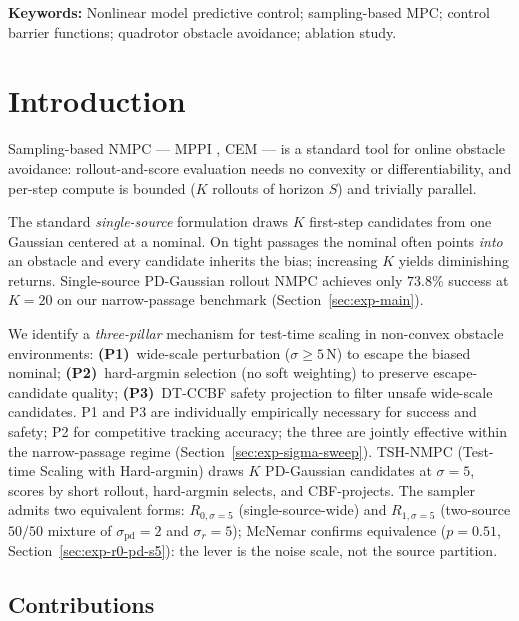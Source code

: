 \documentclass[11pt,onecolumn,a4paper]{article}
\newcommand{\pd}{\mathrm{pd}}
\begin{document}
\medskip
\noindent\textbf{Keywords:} Nonlinear model predictive control; sampling-based MPC; control barrier functions; quadrotor obstacle avoidance; ablation study.
\medskip

\section{Introduction}

Sampling-based NMPC --- MPPI \cite{WIL17}, CEM \cite{BOT13} --- is a
standard tool for online obstacle avoidance: rollout-and-score
evaluation needs no convexity or differentiability, and per-step
compute is bounded ($K$ rollouts of horizon $S$) and trivially parallel.

The standard \emph{single-source} formulation draws $K$ first-step
candidates from one Gaussian centered at a nominal. On tight passages
the nominal often points \emph{into} an obstacle and every candidate
inherits the bias; increasing $K$ yields diminishing returns.
Single-source PD-Gaussian rollout NMPC achieves only $73.8\%$ success
at $K = 20$ on our narrow-passage benchmark (Section~\ref{sec:exp-main}).

We identify a \emph{three-pillar} mechanism for test-time scaling
in non-convex obstacle environments:
\textbf{(P1)}~wide-scale perturbation ($\sigma \ge 5\,$N) to escape
the biased nominal; \textbf{(P2)}~hard-argmin selection (no soft
weighting) to preserve escape-candidate quality; \textbf{(P3)}~DT-CCBF
safety projection to filter unsafe wide-scale candidates. P1 and P3
are individually empirically necessary for success and safety; P2 for
competitive tracking accuracy; the three are jointly effective within
the narrow-passage regime (Section~\ref{sec:exp-sigma-sweep}).
TSH-NMPC (Test-time Scaling with Hard-argmin) draws $K$ PD-Gaussian
candidates at $\sigma = 5$, scores by short rollout, hard-argmin
selects, and CBF-projects. The sampler admits two equivalent forms:
$R_{0,\sigma=5}$ (single-source-wide) and $R_{1,\sigma=5}$
(two-source $50/50$ mixture of $\sigma_\pd = 2$ and $\sigma_r = 5$);
McNemar confirms equivalence ($p = 0.51$,
Section~\ref{sec:exp-r0-pd-s5}): the lever is the noise scale, not
the source partition.

\subsection{Contributions}
\end{document}
